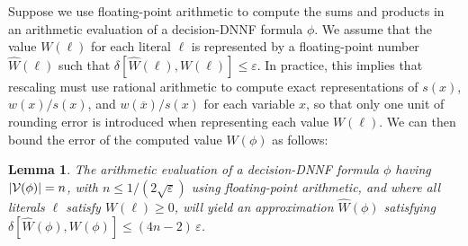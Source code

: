 \documentclass{easychair}
\newcommand{\obar}[1]{\overline{#1}}
\newcommand{\lit}{\ell}
\newcommand{\approximate}[1]{\hat{#1}}
\newcommand{\approxW}{\approximate{W}}
\newcommand{\aerror}{\delta}
\newcommand{\roundepsilon}{\varepsilon}
\newcommand{\dependencyset}{{\cal V}}
\newtheorem{lemma}{Lemma}
\begin{document}
Suppose we use floating-point arithmetic to compute the sums and
products in an arithmetic evaluation of a decision-DNNF formula $\phi$.
We assume that the value $W(\lit)$ for each literal $\lit$ is
represented by a floating-point number $\approxW(\lit)$ such that
$\aerror[\approxW(\lit), W(\lit)] \leq \roundepsilon$.  In practice,
this implies that rescaling must use rational arithmetic to
compute exact representations of $s(x)$, $w(x)/s(x)$, and
$w(\obar{x})/s(x)$ for each variable $x$, so that only one unit of
rounding error is introduced when representing each value $W(\lit)$.
We can then bound the error of the computed value $W(\phi)$ as follows:
\begin{lemma}
  The arithmetic evaluation of a decision-DNNF formula $\phi$  having $|\dependencyset(\phi)| = n$, with
  $n \leq 1/(2\sqrt{\roundepsilon})$
  using floating-point arithmetic,
  and where all literals $\ell$ satisfy $W(\lit) \geq 0$,
  will yield an approximation $\approxW(\phi)$ satisfying
  $\aerror[\approxW(\phi), W(\phi)] \leq (4n-2)\,\roundepsilon$.
  \label{lemma:approx:pos}
\end{lemma}
\end{document}
